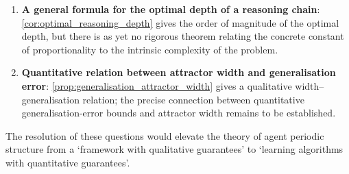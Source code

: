 \begin{remark}
\begin{enumerate}[label=(\roman*)]
    \item \textbf{A general formula for the optimal depth of a reasoning chain}: \cref{cor:optimal_reasoning_depth} gives the order of magnitude of the optimal depth, but there is as yet no rigorous theorem relating the concrete constant of proportionality to the intrinsic complexity of the problem.
    \item \textbf{Quantitative relation between attractor width and generalisation error}: \cref{prop:generalisation_attractor_width} gives a qualitative width--generalisation relation; the precise connection between quantitative generalisation-error bounds and attractor width remains to be established.
\end{enumerate}
The resolution of these questions would elevate the theory of agent periodic structure from a `framework with qualitative guarantees' to `learning algorithms with quantitative guarantees'.
\end{remark}

